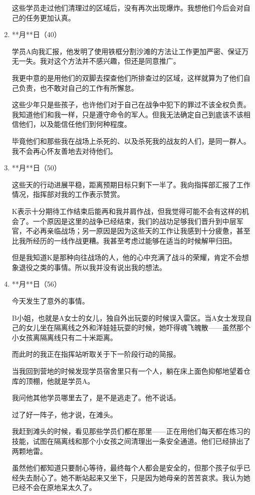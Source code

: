 \begin{enumerate}
这些学员走过他们清理过的区域后，没有再次出现爆炸。我想他们今后会对自己的任务更加认真。
    \item **月**日（40）
    
学员A向我汇报，他发明了使用铁框分割沙滩的方法让工作更加严密、保证万无一失。我对这个方法并不感兴趣，但还是同意推广。

我更中意的是用他们的双脚去探查他们所排查过的区域，这样就算为了他们自己负责，也不敢对自己的工作有所懈怠。

这些少年只是些孩子，也许他们对于自己在战争中犯下的罪过不该全权负责。我知道他们和我一样，只是遵守命令的军人。但我无法确定自己到底该不该相信他们，以及能信任他们到何种程度。

毕竟他们和那些我在战场上杀死的、以及杀死我的战友的人们，是同一群人。我不会再心怀友善地去对待他们。
    \item **月**日（50）

这些天的行动进展平稳，距离预期目标只剩下一半了。我向指挥部汇报了工作情况，指挥部对我的工作表示赞赏。

K表示十分期待工作结束后能再和我并肩作战，但我觉得可能不会有这样的机会了。一个原因是这里的战争已经结束，我们的战功足够我们晋升到中层军官，不必再亲临战场；另一原因是因为这些天的工作让我感到十分疲惫，甚至比我所经历的一线作战更糟。我甚至考虑过能够在适当的时候解甲归田。

但是我知道K是那种向往战场的人，他的心中充满了战斗的荣耀，肯定不会想象退役之类的事情。所以我并没有说出我的想法。
    \item **月**日（56）

今天发生了意外的事情。

B小姐，也就是A女士的女儿，独自外出玩耍的时候误入雷区。当A女士发现自己的女儿坐在隔离线之外和洋娃娃玩耍的时候，她吓得魂飞魄散——虽然那个小女孩离隔离线只有二十米距离。

而此时的我正在指挥站听取关于下一阶段行动的简报。

当我回到营地的时候发现学员宿舍里只有一个人，躺在床上面色抑郁地望着仓库的顶棚，他就是学员A。

我问他其他学员哪里去了，是不是逃走了。他不说话。

过了好一阵子，他才说，在滩头。

我赶到滩头的时候，看见那些学员们都在那里——正在用他们每天都在练习的技能，试图在隔离线和那个小女孩之间清理出一条安全通道。他们已经排出了两颗地雷。

虽然他们都知道只要耐心等待，最终每个人都会是安全的，但那个孩子似乎已经失去耐心了。她不断站起来又坐下，只是因为她母亲的苦苦哀求。我认为她已经不会在原地呆太久了。


\end{enumerate}
